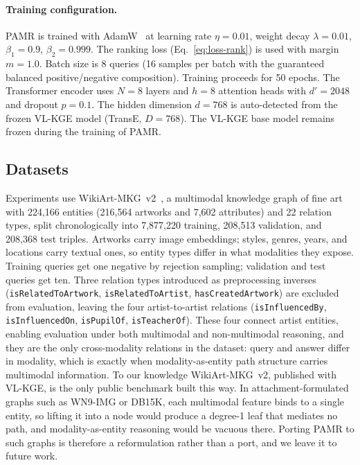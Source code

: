 \documentclass[runningheads]{llncs}
\begin{document}
\paragraph{Training configuration.}
PAMR is trained with AdamW~\cite{loshchilov2019decoupled} at learning
rate $\eta = 0.01$, weight decay $\lambda = 0.01$, $\beta_1 = 0.9$,
$\beta_2 = 0.999$. The ranking loss (Eq.~\ref{eq:loss-rank}) is
used with margin $m = 1.0$. Batch size is 8 queries (16 samples per
batch with the guaranteed balanced positive/negative composition).
Training proceeds for 50 epochs. The Transformer encoder uses
$N = 8$ layers and $h = 8$ attention heads with
$d' = 2048$ and dropout $p = 0.1$. The hidden dimension
$d = 768$ is auto-detected from the frozen VL-KGE
model (TransE, $D = 768$). The
VL-KGE base model remains frozen during the training of PAMR.

\subsection{Datasets}
\label{sec:datasets}

Experiments use WikiArt-MKG~v2~\cite{efthymiou2026vlkge}, a multimodal
knowledge graph of fine art with 224,166 entities (216,564 artworks and
7,602 attributes) and 22 relation types, split chronologically into
7,877,220 training, 208,513 validation, and 208,368 test triples.
Artworks carry image embeddings; styles, genres, years, and locations
carry textual ones, so entity types differ in what modalities they
expose. Training queries get one negative by rejection sampling;
validation and test queries get ten. Three relation types introduced as
preprocessing inverses
(\texttt{isRelatedToArtwork}, \texttt{isRelatedToArtist},
\texttt{hasCreatedArtwork}) are excluded from evaluation, leaving the
four artist-to-artist relations (\texttt{isInfluencedBy},
\texttt{isInfluencedOn}, \texttt{isPupilOf}, \texttt{isTeacherOf}).
These four connect artist entities, enabling evaluation under both
multimodal and non-multimodal reasoning, and they are the only
cross-modality relations in the dataset: query and answer differ in
modality, which is exactly when modality-as-entity path structure
carries multimodal information. To our knowledge WikiArt-MKG~v2,
published with VL-KGE, is the only public benchmark built this way. In
attachment-formulated graphs such as WN9-IMG or DB15K, each multimodal
feature binds to a single entity, so lifting it into a node would
produce a degree-1 leaf that mediates no path, and modality-as-entity
reasoning would be vacuous there. Porting PAMR to such graphs is
therefore a reformulation rather than a port, and we leave it to
future work.
\end{document}
